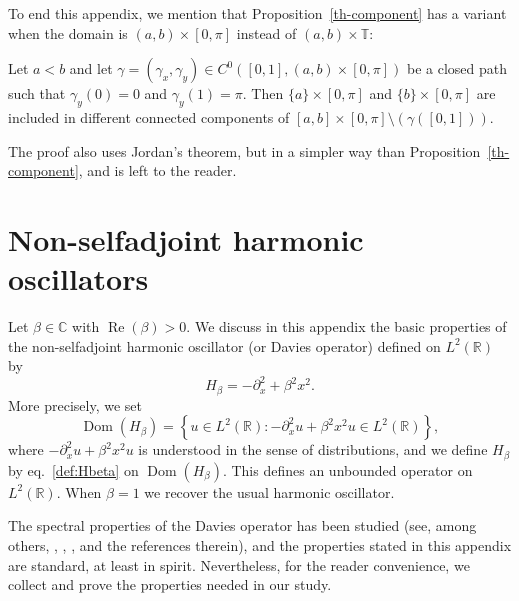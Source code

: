 \documentclass[10pt]{amsart}
\theoremstyle{definition}\newtheorem{defi}[theo]{Definition}\newtheorem{rema}[theo]{Remark}\newtheorem{exam}[theo]{Example}\newtheorem{exem}[theo]{Example}\newtheorem{nota}[theo]{Notation}
\newcommand{\set}[1]{\left\{ #1 \right\}}
\newcommand{\1}{\mathds 1}
\DeclareMathOperator{\Ree}{Re}
\DeclareMathOperator{\Dom}{Dom}
\newcommand{\R}{\mathbb{R}}
\newcommand{\C}{\mathbb{C}}
\newcommand{\T}{\mathbb{T}}
\renewcommand{\b}{\beta}
\newcommand{\g}{\gamma}
\begin{document}
To end this appendix, we mention that Proposition~\ref{th-component} has a variant when the domain is $(a,b)\times [0,\pi]$ instead of $(a,b)\times \T$:

\begin{prop}\label{th-component-segment}
Let $a<b$ and let $\g = (\g_x,\g_y) \in C^0([0,1], (a,b)\times [0,\pi])$ be a closed path such that $\g_y(0) = 0$ and $\g_y(1) = \pi$. Then $\{a\}\times [0,\pi]$ and $\{b\}\times [0,\pi]$ are included in different connected components of $[a,b]\times[0,\pi] \setminus (\g([0,1]))$.
\end{prop}

The proof also uses Jordan's theorem, but in a simpler way than Proposition~\ref{th-component}, and is left to the reader.

\section{Non-selfadjoint harmonic oscillators} \label{sec:Davies-operator}

Let $\b \in \C$ with $\Ree(\b) > 0$. We discuss in this appendix the basic properties of the non-selfadjoint harmonic oscillator (or Davies operator) defined on $L^2(\R)$ by
\begin{equation}\label{def:Hbeta}
H_\beta = - \partial_x^2 + \beta^2 x^2.
\end{equation}
More precisely, we set
\[
\Dom(H_\beta) = \set{u \in L^2(\R) \colon {-}\partial_x^2 u + \beta^2 x^2 u \in L^2(\R)},
\]
where $-\partial_x^2 u + \beta^2 x^2 u$ is understood in the sense of distributions, and we define $H_\b$ by eq.~\eqref{def:Hbeta} on $\Dom(H_\beta)$. This defines an unbounded operator on $L^2(\R)$. When $\b = 1$ we recover the usual harmonic oscillator.

The spectral properties of the Davies operator has been studied (see, among others, \cite[\S~14.5]{Davies07}, \cite[\S~14.4]{Helffer13}, \cite{KSTV15}, and the references therein), and the properties stated in this appendix are standard, at least in spirit. Nevertheless, for the reader convenience, we collect and prove the properties needed in our study.
\end{document}
